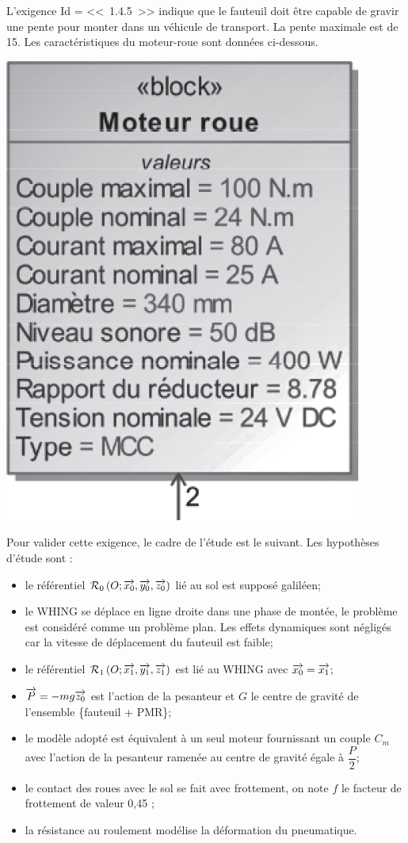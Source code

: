 \documentclass[10pt,fleqn]{article} %
\begin{document}
\begin{multicols}{2}
\begin{multicols}{2}
\begin{obj}
L'exigence Id = <<~1.4.5~>> indique que le fauteuil doit être capable de gravir une pente pour
monter dans un véhicule de transport. La pente maximale est de 15\degres. Les caractéristiques du moteur-roue
sont données ci-dessous.
\end{obj}


\begin{center}
\includegraphics[width=.5\linewidth]{images/fig_02}
\end{center}

Pour valider cette exigence, le cadre de l'étude est le suivant.
Les hypothèses d'étude sont :
\begin{itemize}
\item le référentiel $\mathcal{R}_{0}\left(O;\overrightarrow{x_0},\overrightarrow{y_0},\overrightarrow{z_0} \right)$ lié au sol est supposé galiléen;
\item le WHING se déplace en ligne droite dans une phase de montée, le problème est considéré comme un problème plan. Les effets dynamiques sont négligés car la vitesse de déplacement du
fauteuil est faible;
\item le référentiel $\mathcal{R}_{1}\left(O;\overrightarrow{x_1},\overrightarrow{y_1},\overrightarrow{z_1} \right)$ est lié au WHING avec $\overrightarrow{x_0}=\overrightarrow{x_1}$;
\item $\overrightarrow{P}=-mg\overrightarrow{z_0}$ est l'action de la pesanteur et $G$ le centre de gravité de l'ensemble \{fauteuil +
PMR\};
\item le modèle adopté est équivalent à un seul moteur fournissant un couple $C_m$ avec l'action de la
pesanteur ramenée au centre de gravité égale à $\dfrac{P}{2}$;
\item le contact des roues avec le sol se fait avec frottement, on note $f$ le facteur de frottement de valeur 0,45 ;
\item la résistance au roulement modélise la déformation du pneumatique.
\end{itemize}


\end{multicols}
\end{multicols}
\end{document}
